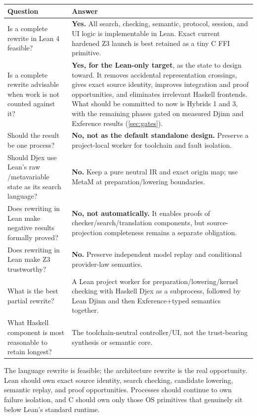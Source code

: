 \documentclass[10pt,letterpaper,oneside]{report}
\newcommand{\code}[1]{\texttt{\detokenize{#1}}}
\begin{document}
\begin{longtable}{@{}L{0.39\textwidth}L{0.53\textwidth}@{}}
\toprule
\textbf{Question} & \textbf{Answer} \\
\midrule
\endhead
Is a complete rewrite in Lean 4 feasible? & \textbf{Yes.} All search, checking, semantic, protocol, session, and UI logic is implementable in Lean. Exact current hardened Z3 launch is best retained as a tiny C FFI primitive. \\
Is a complete rewrite advisable when work is not counted against it? & \textbf{Yes, for the Lean-only target}, as the state to design toward. It removes accidental representation crossings, gives exact source identity, improves integration and proof opportunities, and eliminates irrelevant Haskell frontends. What should be committed to now is Hybrids 1 and 3, with the remaining phases gated on measured Djinn and Exference results (\autoref{sec:gates}). \\
Should the result be one process? & \textbf{No, not as the default standalone design.} Preserve a project-local worker for toolchain and fault isolation. \\
Should Djex use Lean's raw \code{Expr}/metavariable state as its search language? & \textbf{No.} Keep a pure neutral IR and exact origin map; use MetaM at preparation/lowering boundaries. \\
Does rewriting in Lean make negative results formally proved? & \textbf{No, not automatically.} It enables proofs of checker/search/translation components, but source-projection completeness remains a separate obligation. \\
Does rewriting in Lean make Z3 trustworthy? & \textbf{No.} Preserve independent model replay and conditional provider-law semantics. \\
What is the best partial rewrite? & A Lean project worker for preparation/lowering/kernel checking with Haskell Djex as a subprocess, followed by Lean Djinn and then Exference+typed semantics together. \\
What Haskell component is most reasonable to retain longest? & The toolchain-neutral controller/UI, not the trust-bearing synthesis or semantic core. \\
\bottomrule
\end{longtable}

\begin{summarybox}
The language rewrite is feasible; the architecture rewrite is the real opportunity. Lean should own exact source identity, search checking, candidate lowering, semantic replay, and proof opportunities. Processes should continue to own failure isolation, and C should own only those OS primitives that genuinely sit below Lean's standard runtime.
\end{summarybox}
\end{document}
